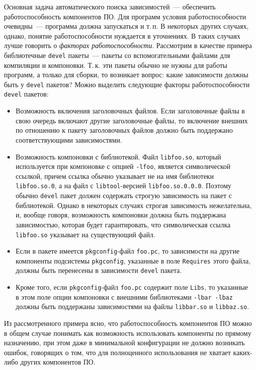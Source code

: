 \documentclass[russian,a4paper,12pt,titlepage]{article}
\begin{document}
Основная задача автоматического поиска зависимостей~--- обеспечить работоспособность компонентов ПО.
Для программ условия работоспособности очевидны~--- программа должна запускаться и т.\,п.
В некоторых других случаях, однако, понятие работоспособности нуждается в уточнениях.  В таких случаях
лучше говорить о \emph{факторах работоспособности}.  Рассмотрим в качестве примера библиотечные \texttt{devel}
пакеты~--- пакеты со вспомогательными файлами для компиляции и компоновки.  Т.\,к. эти пакеты обычно не нужны
для работы программ, а только для сборки, то возникает вопрос: какие зависимости должны быть у \texttt{devel}
пакетов?  Можно выделить следующие факторы работоспособности \texttt{devel} пакетов:
\begin{itemize}
\item Возможность включения заголовочных файлов.
Если заголовочные файлы в свою очередь включают другие заголовочные файлы, то включение внешних
по отношению к пакету заголовочных файлов должно быть поддержано соответствующими зависимостями.
\item Возможность компоновки с библиотекой.
Файл \verb|libfoo.so|, который используется при компоновке с опцией \verb|-lfoo|, является
символической ссылкой, причем ссылка обычно указывает не на имя библиотеки \verb|libfoo.so.0|, а на файл
с \verb|libtool|-версией \verb|libfoo.so.0.0.0|.  Поэтому обычно \verb|devel| пакет должен содержать
строгую зависимость на пакет с библиотекой.  Однако в некоторых случаях строгая зависимость нежелательна,
и, вообще говоря, возможность компоновки должна быть поддержана зависимостью, которая будет гарантировать,
что символическая ссылка \verb|libfoo.so| указывает на существующий файл.
\item Если в пакете имеется \verb|pkgconfig|-файл \verb|foo.pc|, то зависимости на другие компоненты
подсистемы \verb|pkgconfig|, указанные в поле \verb|Requires| этого файла, должны быть перенесены в зависимости
\verb|devel| пакета.
\item Кроме того, если \verb|pkgconfig|-файл \verb|foo.pc| содержит поле \verb|Libs|, то указанные в этом поле
опции компоновки с внешними библиотеками \texttt{-lbar -lbaz} должны быть поддержаны зависимостями на файлы
\verb|libbar.so| и \verb|libbaz.so|.
\end{itemize}

Из рассмотренного примера ясно, что работоспособность компонентов ПО можно в общем случае понимать
как возможность использовать компоненты по прямому назначению, при этом даже в минимальной конфигурации
не должно возникать ошибок, говорящих о том, что для полноценного использования не хватает каких-либо
других компонентов ПО.
\end{document}
